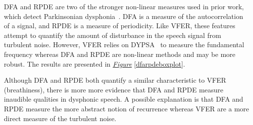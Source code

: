 \documentclass[12pt, twoside]{book}
\begin{document}
DFA and RPDE are two of the stronger non-linear measures used in prior work, which detect Parkinsonian dysphonia~\cite{splittledysphonia2009}. DFA is a measure of the autocorrelation of a signal, and RPDE is a measure of periodicity. Like VFER, these features attempt to quantify the amount of disturbance in the speech signal from turbulent noise. However, VFER relies on DYPSA~\cite{dypsa} to measure the fundamental frequency whereas DFA and RPDE are non-linear methods and may be more robust. The results are presented in \textit{\hyperref[dfarpdeboxplot]{Figure}} \ref{dfarpdeboxplot}. 



Although DFA and RPDE both quantify a similar characteristic to VFER (breathiness), there is more more evidence that DFA and RPDE measure inaudible qualities in dysphonic speech. A possible explanation is that DFA and RPDE measure the more abstract notion of recurrence whereas VFER are a more direct measure of the turbulent noise. 


\end{document}
